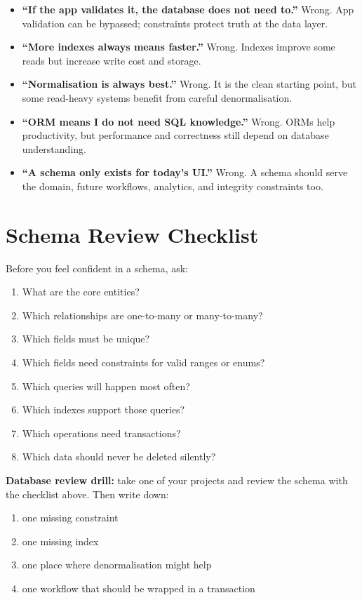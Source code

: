 \documentclass[12pt, a4paper, oneside]{book}
\begin{document}
\begin{itemize}[leftmargin=2em]
    \item \textbf{``If the app validates it, the database does not need to.''} Wrong. App validation can be bypassed; constraints protect truth at the data layer.
    \item \textbf{``More indexes always means faster.''} Wrong. Indexes improve some reads but increase write cost and storage.
    \item \textbf{``Normalisation is always best.''} Wrong. It is the clean starting point, but some read-heavy systems benefit from careful denormalisation.
    \item \textbf{``ORM means I do not need SQL knowledge.''} Wrong. ORMs help productivity, but performance and correctness still depend on database understanding.
    \item \textbf{``A schema only exists for today’s UI.''} Wrong. A schema should serve the domain, future workflows, analytics, and integrity constraints too.
\end{itemize}

\section{Schema Review Checklist}

Before you feel confident in a schema, ask:
\begin{enumerate}[leftmargin=2em]
    \item What are the core entities?
    \item Which relationships are one-to-many or many-to-many?
    \item Which fields must be unique?
    \item Which fields need constraints for valid ranges or enums?
    \item Which queries will happen most often?
    \item Which indexes support those queries?
    \item Which operations need transactions?
    \item Which data should never be deleted silently?
\end{enumerate}

\begin{exercisebox}
\textbf{Database review drill:} take one of your projects and review the schema with the checklist above. Then write down:
\begin{enumerate}[leftmargin=2em]
    \item one missing constraint
    \item one missing index
    \item one place where denormalisation might help
    \item one workflow that should be wrapped in a transaction
\end{enumerate}
\end{exercisebox}
\end{document}
